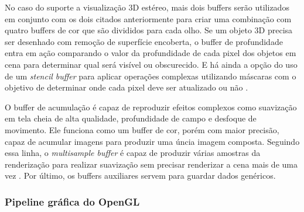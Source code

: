 \begin{figure}[h!]
	\centering
\end{figure}
\nocite{stcbuf}
	
No caso do suporte a visualização 3D estéreo, mais dois buffers serão utilizados em conjunto com os dois citados anteriormente para criar uma combinação com quatro buffers de cor que são divididos para cada olho. Se um objeto 3D precisa ser desenhado com remoção de superfície encoberta, o buffer de profundidade entra em ação comparando o valor da profundidade de cada pixel dos objetos em cena para determinar qual será visível ou obscurecido. E há ainda a opção do uso de um \textit{stencil buffer} para aplicar operações complexas utilizando máscaras com o objetivo de determinar onde cada pixel deve ser atualizado ou não \cite{GLSLBook}.

O buffer de acumulação é capaz de reproduzir efeitos complexos como suavização em tela cheia de alta qualidade, profundidade de campo e desfoque de movimento. Ele funciona como um buffer de cor, porém com maior precisão, capaz de acumular imagens para produzir uma úncia imagem composta. Seguindo essa linha, o \textit{multisample buffer} é capaz de produzir várias amostras da renderização para realizar suavização sem precisar renderizar a cena mais de uma vez \cite{GLSLBook}. Por último, os buffers auxiliares servem para guardar dados genéricos. 

\subsubsection{Pipeline gráfica do OpenGL}
\label{sec:pipeline-opengl}

